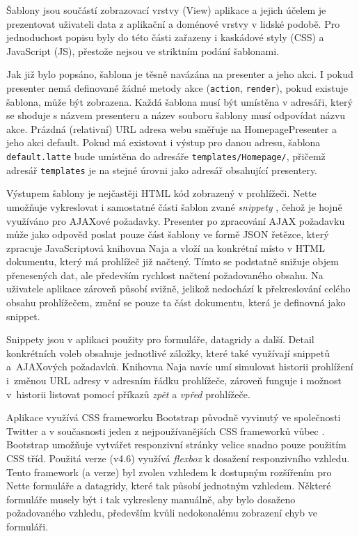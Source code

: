 Šablony jsou součástí zobrazovací vrstvy (View) aplikace a jejich účelem je prezentovat uživateli data z aplikační a doménové vrstvy v lidské podobě. Pro jednoduchost popisu byly do této části zařazeny i kaskádové styly (CSS) a JavaScript (JS), přestože nejsou ve striktním podání šablonami.

Jak již bylo popsáno, šablona je těsně navázána na presenter a jeho akci. I pokud presenter nemá definované žádné metody akce (\texttt{action}, \texttt{render}), pokud existuje šablona, může být zobrazena. Každá šablona musí být umístěna v adresáři, který se shoduje s názvem presenteru a název souboru šablony musí odpovídat názvu akce. Prázdná (relativní) URL adresa webu směřuje na HomepagePresenter a jeho akci default. Pokud má existovat i výstup pro danou adresu, šablona \texttt{default.latte} bude umístěna do adresáře \texttt{templates/Homepage/}, přičemž adresář \texttt{templates} je na stejné úrovni jako adresář obsahující presentery.

Výstupem šablony je nejčastěji HTML kód zobrazený v prohlížeči. Nette umožňuje vykreslovat i samostatné části šablon zvané \textit{snippety} \cite{NetteDocs}, čehož je hojně využíváno pro AJAXové požadavky. Presenter po zpracování AJAX požadavku může jako odpověd poslat pouze část šablony ve formě JSON řetězce, který zpracuje JavaScriptová knihovna Naja a vloží na konkrétní místo v HTML dokumentu, který má prohlížeč již načtený. Tímto se podstatně snižuje objem přenesených dat, ale především rychlost načtení požadovaného obsahu. Na uživatele aplikace zároveň působí svižně, jelikož nedochází k překreslování celého obsahu prohlížečem, změní se pouze ta část dokumentu, která je definovná jako snippet.

Snippety jsou v aplikaci použity pro formuláře, datagridy a další. Detail konkrétních voleb obsahuje jednotlivé záložky, které také využívají snippetů a~AJAXových požadavků. Knihovna Naja navíc umí simulovat historii prohlížení i~změnou URL adresy v adresním řádku prohlížeče, zároveň funguje i možnost v~historii listovat pomocí příkazů \textit{zpět} a \textit{vpřed} prohlížeče.

Aplikace využívá CSS frameworku Bootstrap původně vyvinutý ve společnosti Twitter a v současnosti jeden z nejpoužívanějších CSS frameworků vůbec \cite{Bootstrap}. Bootstrap umožňuje vytvářet responzivní stránky velice snadno pouze použitím CSS tříd. Použitá verze (v4.6) využívá \textit{flexbox} k dosažení responzivního vzhledu. Tento framework (a verze) byl zvolen vzhledem k dostupným rozšířením pro Nette formuláře a datagridy, které tak působí jednotným vzhledem. Některé formuláře musely být i tak vykresleny manuálně, aby bylo dosaženo požadovaného vzhledu, především kvůli nedokonalému zobrazení chyb ve formuláři.

